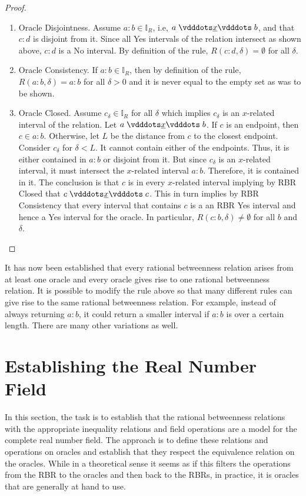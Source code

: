 \documentclass[12pt]{article}
\begin{document}
\begin{proof}
\begin{enumerate}
        \item Oracle Disjointness. Assume $a:b \in \mathbb{I}_R$, i.e, $a \xrel b$, and that $c:d$ is disjoint from it. Since all Yes intervals of the relation intersect as shown above, $c:d$ is a No interval. By definition of the rule, $R(c:d, \delta) = \emptyset$ for all $\delta$. 
        \item Oracle Consistency. If $a:b \in \mathbb{I}_R$, then by definition of the rule, $R(a:b, \delta) = a:b$ for all $\delta >0$ and it is never equal to the empty set as was to be shown. 
        \item Oracle Closed. Assume $c_\delta \in \mathbb{I}_R$ for all $\delta$ which implies $c_\delta$ is an $x$-related interval of the relation. Let $a \xrel b$. If $c$ is an endpoint, then $c \in a:b$. Otherwise, let $L$ be the distance from $c$ to the closest endpoint. Consider $c_\delta$ for $\delta < L$. It cannot contain either of the endpoints. Thus, it is either contained in $a:b$ or disjoint from it. But since $c_\delta$ is an $x$-related interval, it must intersect the $x$-related interval $a:b$. Therefore, it is contained in it. The conclusion is that $c$ is in every $x$-related interval implying by RBR Closed that $c \xrel c$. This in turn implies by RBR Consistency that every interval that contains $c$ is a an RBR Yes interval and hence a Yes interval for the oracle. In particular, $R(c:b, \delta) \neq \emptyset$ for all $b$ and $\delta$. 
    \end{enumerate}
\end{proof}


It has now been established that every rational betweenness relation arises from at least one oracle and every oracle gives rise to one rational betweenness relation. It is possible to modify the rule above so that many different rules can give rise to the same rational betweenness relation. For example, instead of always returning $a:b$, it could return a smaller interval if $a:b$ is over a certain length. There are many other variations as well. 




\section{Establishing the Real Number Field}

In this section, the task is to establish that the rational betweenness relations with the appropriate inequality relations and field operations are a model for the complete real number field. The approach is to define these relations and operations on oracles and establish that they respect the equivalence relation on the oracles. While in a theoretical sense it seems as if this filters the operations from the RBR to the oracles and then back to the RBRs, in practice, it is oracles that are generally at hand to use. 
\end{document}
